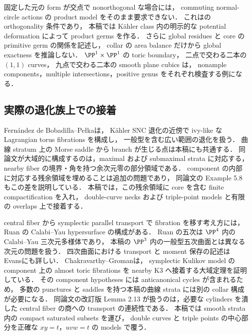 固定した元の form が交点で nonorthogonal な場合には，
commuting normal-circle actions の product model をそのまま要求できない．
これは\cite[Proposition 2.5]{BSV}の orthogonality 条件であり，
本稿では Kähler class 内の明示的な potential deformation によって product germs を作る．
さらに global residues と core の primitive germ の関係を記述し，
collar の area balance だけから global exactness を推論しない．
$\PP^1\times\PP^1$ の toric boundary，
二点で交わる二本の $(1,1)$ curves，
九点で交わる二本の smooth plane cubics は，
nonample components，multiple intersections，positive genus をそれぞれ検査する例になる．

\subsection{実際の退化族上での接着}

Fernández de Bobadilla--Pełka\cite[Proposition 5.6, Theorem 6.14]{FBP}は，
Kähler SNC 退化の近傍で ivy-like な Lagrangian torus fibrations を構成し，
一般型を含む広い範囲の退化を扱う．
曲線 stratum 上の Morse saddle から branch が生じる点は本稿にも共通する．
同論文が大域的に構成するのは，maximal および submaximal strata に対応する，
nearby fiber の境界・角を持つ余次元零の部分領域である．
component の内部に対応する残余領域を埋めることは追加の問題であり，
同論文の Example 5.8 もこの差を説明している．
本稿では，この残余領域に core を含む finite compactification を入れ，
double-curve necks および triple-point models と有限の overlaps 上で接着する．

central fiber から symplectic parallel transport で fibration を移す考え方には，
Ruan の Calabi--Yau hypersurface の構成\cite{Ruan}がある．
Ruan の五次は $\PP^4$ 内の Calabi--Yau 三次元多様体であり，
本稿の $\PP^3$ 内の一般型五次曲面とは異なる次元の問題を扱う．
四次曲面における transport と moment 保存の記述は
Evans\cite[Chapter 6]{EvansNotes}にも詳しい．
Chakravarthy--Groman\cite[Theorem 1.6]{CGK3}は，
symplectic Kulikov model の component 上の almost toric fibrations を
nearby K3 へ接着する大域定理を証明している．
その component hypotheses には anticanonical cycles が含まれるため，
多数の punctures と saddles を持つ本稿の曲線 strata には別の collar 構成が必要になる．
同論文の改訂版 Lemma 2.13 が扱うのは，必要な cylinders を潰した
central fiber の商への transport の連続性である．
本稿では smooth strata 内の compact saturated subsets を運び，
double curves と triple points の中心部分を正確な $xy=t$，$uvw=t$ の models で覆う．

